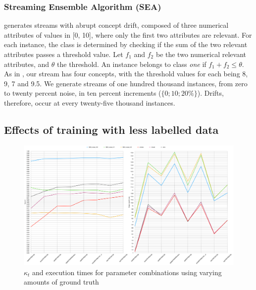 \documentclass[runningheads]{llncs}
\begin{document}
\subsubsection{Streaming Ensemble Algorithm (SEA)}
generates streams with abrupt concept drift, composed of three numerical attributes of values in [0, 10], where only the first two attributes are relevant. For each instance, the class is determined by checking if the sum of the two relevant attributes passes a threshold value. Let $f_1$ and $f_2$ be the two numerical relevant attributes, and $\theta$ the threshold. An instance belongs to class \textit{one} if $f_1 + f_2 \leq \theta$. As in \cite{street2001streaming}, our stream has four concepts, with the threshold values for each being 8, 9, 7 and 9.5. We generate streams of one hundred thousand instances, from zero to twenty percent noise, in ten percent increments ($\{0; 10; 20\%\}$). Drifts, therefore, occur at every twenty-five thousand instances.




\subsection{Effects of training with less labelled data}
\begin{figure}
  \includegraphics[width=\linewidth]{./images/chapter5/ground_truth_both}
\caption{\label{fig:ground_truth_drop}$\kappa_t$ and execution times for parameter combinations using varying amounts of ground truth}
\end{figure}
\end{document}
